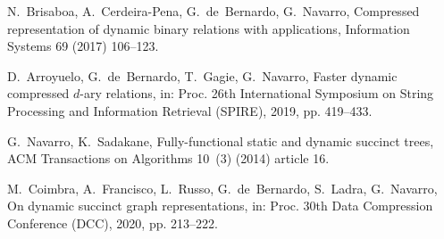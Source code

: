 \documentclass{elsarticle}
\begin{document}
\begin{thebibliography}{10}
N.~Brisaboa, A.~Cerdeira-Pena, G.~de~Bernardo, G.~Navarro, Compressed
  representation of dynamic binary relations with applications, Information
  Systems 69 (2017) 106--123.

D.~Arroyuelo, G.~de~Bernardo, T.~Gagie, G.~Navarro, Faster dynamic compressed
  $d$-ary relations, in: Proc. 26th International Symposium on String
  Processing and Information Retrieval (SPIRE), 2019, pp. 419--433.

G.~Navarro, K.~Sadakane, Fully-functional static and dynamic succinct trees,
  ACM Transactions on Algorithms 10~(3) (2014) article 16.

M.~Coimbra, A.~Francisco, L.~Russo, G.~de~Bernardo, S.~Ladra, G.~Navarro, On
  dynamic succinct graph representations, in: Proc. 30th Data Compression
  Conference (DCC), 2020, pp. 213--222.

\end{thebibliography}
\end{document}
